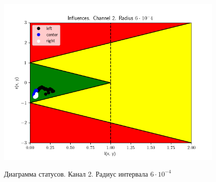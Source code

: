 \begin{figure}[H]
	\begin{center}
		\includegraphics[scale=0.83]{status_ch2_rad6}
		\label{pic:ch26}
		\caption{Диаграмма статусов. Канал 2. Радиус интервала $6 \cdot 10 ^ {-4}$}
	\end{center}
\end{figure}